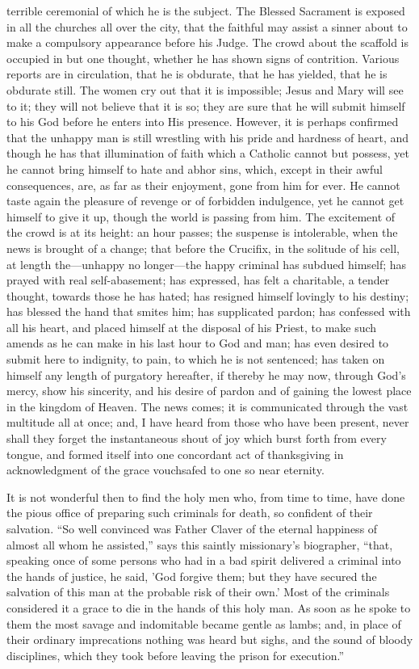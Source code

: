 terrible ceremonial of which he is the subject. The Blessed Sacrament
is exposed in all the churches all over the city, that the faithful
may assist a sinner about to make a compulsory appearance before his
Judge. The crowd about the scaffold is occupied in but one thought,
whether he has shown signs of contrition. Various reports are in
circulation, that he is obdurate, that he has yielded, that he is
obdurate still. The women cry out that it is impossible; Jesus and
Mary will see to it; they will not believe that it is so; they are
sure that he will submit himself to his God before he enters into His
presence. However, it is perhaps confirmed that the unhappy man is
still wrestling with his pride and hardness of heart, and though he
has that illumination of faith which a Catholic cannot but possess,
yet he cannot bring himself to hate and abhor sins, which, except in
their awful consequences, are, as far as their enjoyment, gone from
him for ever. He cannot taste again the pleasure of revenge or of
forbidden indulgence, yet he cannot get himself to give it up, though
the world is passing from him. The excitement of the crowd is at its
height: an hour passes; the suspense is intolerable, when the news is
brought of a change; that before the Crucifix, in the solitude of his
cell, at length the—unhappy no longer—the happy criminal has
subdued himself; has prayed with real self-abasement; has expressed,
has felt a charitable, a tender thought, towards those he has hated;
has resigned himself lovingly to his destiny; has blessed the hand
that smites him; has supplicated pardon; has confessed with all his
heart, and placed himself at the disposal of his Priest, to make such
amends as he can make in his last hour to God and man; has even
desired to submit here to indignity, to pain, to which he is not
sentenced; has taken on himself any length of purgatory hereafter, if
thereby he may now, through God's mercy, show his sincerity, and his
desire of pardon and of gaining the lowest place in the kingdom of
Heaven. The news comes; it is communicated through the vast multitude
all at once; and, I have heard from those who have been present, never
shall they forget the instantaneous shout of joy which burst forth
from every tongue, and formed itself into one concordant act of
thanksgiving in acknowledgment of the grace vouchsafed to one so near
eternity.

It is not wonderful then to find the holy men who, from time to
time, have done the pious office of preparing such criminals for
death, so confident of their salvation. ``So well convinced was
Father Claver of the eternal happiness of almost all whom he
assisted,'' says this saintly missionary's biographer, ``that,
speaking once of some persons who had in a bad spirit delivered a
criminal into the hands of justice, he said, 'God forgive them; but
they have secured the salvation of this man at the probable risk of
their own.' Most of the criminals considered it a grace to die in the
hands of this holy man. As soon as he spoke to them the most savage
and indomitable became gentle as lambs; and, in place of their
ordinary imprecations nothing was heard but sighs, and the sound of
bloody disciplines, which they took before leaving the prison for
execution.''

